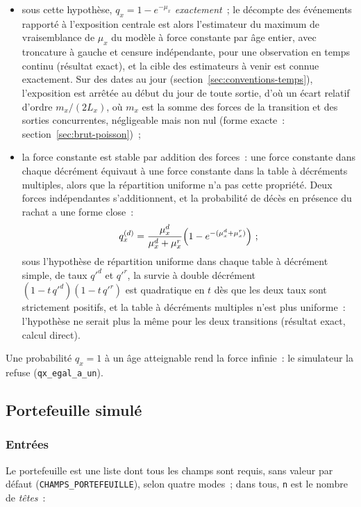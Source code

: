 \documentclass[a4paper,11pt]{article}
\newcommand{\code}[1]{\texttt{\small #1}}
\begin{document}
\begin{itemize}[leftmargin=*, itemsep=2pt]
  \item sous cette hypothèse, $q_x = 1 - e^{-\mu_x}$ \emph{exactement}~; le
    décompte des événements rapporté à l'exposition centrale est alors
    l'estimateur du maximum de vraisemblance de $\mu_x$ du modèle à force
    constante par âge entier, avec troncature à gauche et censure
    indépendante, pour une observation en temps continu (résultat exact), et
    la cible des estimateurs à venir est connue exactement. Sur des dates au
    jour (section~\ref{sec:conventions-temps}), l'exposition est arrêtée au
    début du jour de toute sortie, d'où un écart relatif d'ordre
    $m_x/(2L_x)$, où $m_x$ est la somme des forces de la transition et des
    sorties concurrentes, négligeable mais non nul (forme exacte~:
    section~\ref{sec:brut-poisson})~;
  \item la force constante est stable par addition des forces~: une force
    constante dans chaque décrément équivaut à une force constante dans la
    table à décréments multiples, alors que la répartition uniforme n'a pas
    cette propriété. Deux forces indépendantes s'additionnent, et la
    probabilité de décès en présence du rachat a une forme close~:
    \[
      q^{(d)}_x = \frac{\mu^{d}_x}{\mu^{d}_x + \mu^{r}_x}
      \Bigl(1 - e^{-(\mu^{d}_x + \mu^{r}_x)}\Bigr)~;
    \]
    sous l'hypothèse de répartition uniforme dans chaque table à décrément
    simple, de taux $q'^{d}$ et $q'^{r}$, la survie à double décrément
    $(1 - t\,q'^{d})(1 - t\,q'^{r})$ est quadratique en $t$ dès que les deux
    taux sont strictement positifs, et la table à décréments multiples n'est
    plus uniforme~: l'hypothèse ne serait plus la même pour les deux
    transitions (résultat exact, calcul direct).
\end{itemize}

\noindent
Une probabilité $q_x = 1$ à un âge atteignable rend la force infinie~: le
simulateur la refuse (\code{qx\_egal\_a\_un}).

\subsection{Portefeuille simulé}
\label{sec:portefeuille-simule}

\subsubsection*{Entrées}

{\sloppy{} Le portefeuille est une liste dont tous les champs sont requis, sans valeur
par défaut (\code{CHAMPS\_PORTEFEUILLE}), selon quatre modes~; dans tous,
\code{n} est le nombre de \emph{têtes}~:\par}
\end{document}
